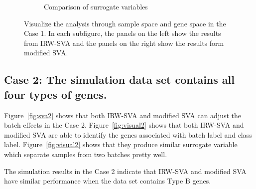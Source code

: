 \documentclass[11pt]{article}
\begin{document}
\begin{figure}[h!]
\begin{subfigure}[t]{0.4\textwidth}
    \caption{Comparison of surrogate variables}
    \label{fig:vector1}
    \end{subfigure}
    \caption{Visualize the analysis through sample space and gene space in the Case 1. In each subfigure, the panels on the left show the results from IRW-SVA and the panels on the right show the results form modified SVA.}
    \label{fig:visual1}
\end{figure}


\newpage

\subsection{Case 2: The simulation data set contains all four types of genes.}

Figure~\ref{fig:sva2} shows that both IRW-SVA and modified SVA can adjust the batch effects in the Case 2.  Figure~\ref{fig:visual2} shows that both IRW-SVA and modified SVA are able to identify the genes associated with batch label and class label. Figure~\ref{fig:visual2} shows that they produce similar surrogate variable which separate samples from two batches pretty well.

The simulation results in the Case 2 indicate that IRW-SVA and modified SVA have similar performance when the data set contains Type B genes.
\end{document}
